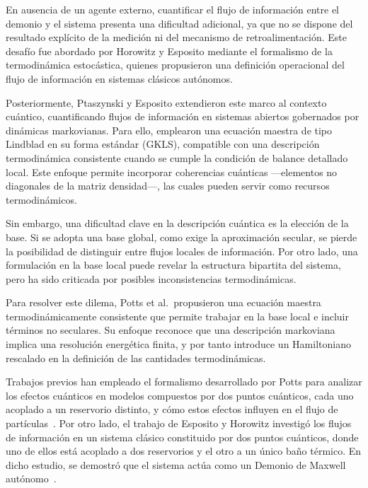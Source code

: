 En ausencia de un agente externo, cuantificar el flujo de información entre el demonio y el sistema presenta una dificultad adicional, ya que no se dispone del resultado explícito de la medición ni del mecanismo de retroalimentación. Este desafío fue abordado por Horowitz y Esposito mediante el formalismo de la termodinámica estocástica\cite{horowitz2014thermodynamics}, quienes propusieron una definición operacional del flujo de información en sistemas clásicos autónomos.

Posteriormente, Ptaszynski y Esposito extendieron este marco al contexto cuántico, cuantificando flujos de información en sistemas abiertos gobernados por dinámicas markovianas\cite{ptaszynski2019thermodynamics}. Para ello, emplearon una ecuación maestra de tipo Lindblad en su forma estándar (GKLS)\cite{gorini1976completely,lindblad1976generators,breuer2002theory}, compatible con una descripción termodinámica consistente cuando se cumple la condición de balance detallado local. Este enfoque permite incorporar coherencias cuánticas —elementos no diagonales de la matriz densidad—, las cuales pueden servir como recursos termodinámicos\cite{ptaszynski2023fermionic,streltsov2017colloquium}.

Sin embargo, una dificultad clave en la descripción cuántica es la elección de la base. Si se adopta una base global, como exige la aproximación secular, se pierde la posibilidad de distinguir entre flujos locales de información. Por otro lado, una formulación en la base local puede revelar la estructura bipartita del sistema, pero ha sido criticada por posibles inconsistencias termodinámicas\cite{levy2014local,novotny2002investigation}.

Para resolver este dilema, Potts et al.\ propusieron una ecuación maestra termodinámicamente consistente que permite trabajar en la base local e incluir términos no seculares\cite{potts2021thermodynamically}. Su enfoque reconoce que una descripción markoviana implica una resolución energética finita, y por tanto introduce un Hamiltoniano rescalado en la definición de las cantidades termodinámicas.

Trabajos previos han empleado el formalismo desarrollado por Potts para analizar los efectos cuánticos en modelos compuestos por dos puntos cuánticos, cada uno acoplado a un reservorio distinto, y cómo estos efectos influyen en el flujo de partículas~\cite{prech2023entanglement}. Por otro lado, el trabajo de Esposito y Horowitz investigó los flujos de información en un sistema clásico constituido por dos puntos cuánticos, donde uno de ellos está acoplado a dos reservorios y el otro a un único baño térmico. En dicho estudio, se demostró que el sistema actúa como un Demonio de Maxwell autónomo~\cite{horowitz2014thermodynamics}.

